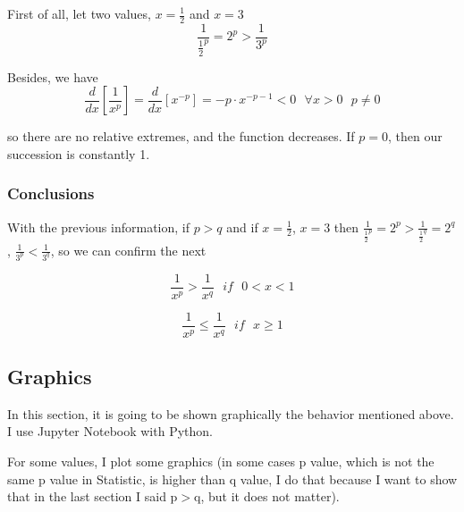 \documentclass{article}
\begin{document}
First of all, let two values, $x=\frac{1}{2}$ and $x=3$
\[
	\frac{1}{\frac{1}{2}^p}={2^p} > \frac{1}{3^p}
\]

Besides, we have
\[
	\frac{d}{dx}\left[ \frac{1}{{x^p}} \right] = \frac{d}{dx}\left[x^{-p} \right] = -p \cdot x^{-p-1} < 0 \textbf{ } \forall x>0 \textbf{ } p\neq 0
\]

so there are no relative extremes, and the function decreases. If \(p = 0\), then our succession is constantly 1.

\subsubsection{Conclusions}

With the previous information, if $p>q$ and if $x=\frac{1}{2}$, $x=3$ then $\frac{1}{\frac{1}{2}^p}={2^p} > \frac{1}{\frac{1}{2}^q}={2^q}$, $\frac{1}{3^p} < \frac{1}{3^q}$, so we can confirm the next

\[
	\frac{1}{{x^p}} > \frac{1}{{x^q}} \textbf{ } if \textbf{ } 0<x<1
\]

\[
	\frac{1}{{x^p}} \leq \frac{1}{{x^q}} \textbf{ } if \textbf{ } x \geq 1
\]

\subsection{Graphics}

In this section, it is going to be shown graphically the behavior mentioned above. I use Jupyter Notebook with Python.

For some values, I plot some graphics (in some cases p value, which is not the same p value in Statistic, is higher than q value, I do that because I want to show that in the last section I said p\(>\)q, but it does not matter).
\end{document}
